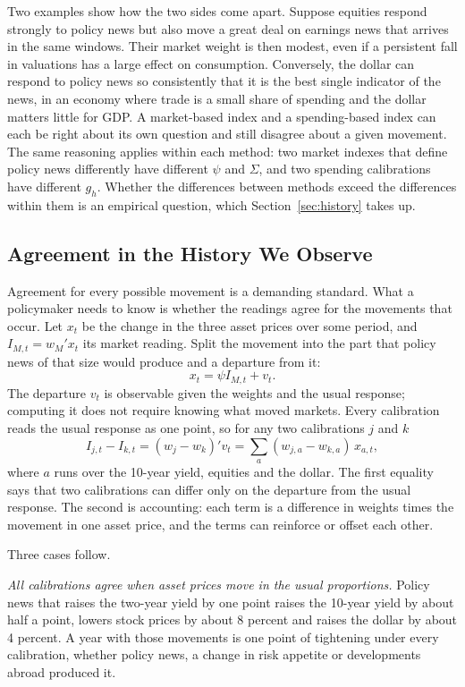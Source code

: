 \documentclass[11pt]{article}
\begin{document}
Two examples show how the two sides come apart. Suppose equities respond strongly to policy news but also move a great deal on earnings news that arrives in the same windows. Their market weight is then modest, even if a persistent fall in valuations has a large effect on consumption. Conversely, the dollar can respond to policy news so consistently that it is the best single indicator of the news, in an economy where trade is a small share of spending and the dollar matters little for GDP. A market-based index and a spending-based index can each be right about its own question and still disagree about a given movement. The same reasoning applies within each method: two market indexes that define policy news differently have different $\psi$ and $\Sigma$, and two spending calibrations have different $g_h$. Whether the differences between methods exceed the differences within them is an empirical question, which Section~\ref{sec:history} takes up.

\subsection{Agreement in the History We Observe}\label{sec:observed}
Agreement for every possible movement is a demanding standard. What a policymaker needs to know is whether the readings agree for the movements that occur. Let $x_t$ be the change in the three asset prices over some period, and $I_{M,t}=w_M'x_t$ its market reading. Split the movement into the part that policy news of that size would produce and a departure from it:
\begin{equation}\label{eq:rem}
x_t=\psi I_{M,t}+v_t .
\end{equation}
The departure $v_t$ is observable given the weights and the usual response; computing it does not require knowing what moved markets. Every calibration reads the usual response as one point, so for any two calibrations $j$ and $k$
\begin{equation}\label{eq:D}
I_{j,t}-I_{k,t}=(w_j-w_k)'v_t=\sum_{a}(w_{j,a}-w_{k,a})\,x_{a,t},
\end{equation}
where $a$ runs over the 10-year yield, equities and the dollar. The first equality says that two calibrations can differ only on the departure from the usual response. The second is accounting: each term is a difference in weights times the movement in one asset price, and the terms can reinforce or offset each other.

Three cases follow.

\textit{All calibrations agree when asset prices move in the usual proportions.} Policy news that raises the two-year yield by one point raises the 10-year yield by about half a point, lowers stock prices by about 8 percent and raises the dollar by about 4 percent. A year with those movements is one point of tightening under every calibration, whether policy news, a change in risk appetite or developments abroad produced it.
\end{document}
